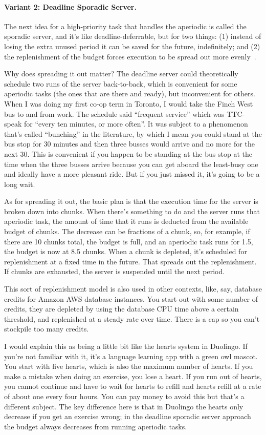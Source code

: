 \paragraph{Variant 2: Deadline Sporadic Server.}
The next idea for a high-priority task that handles the aperiodic is called the sporadic server, and it's like deadline-deferrable, but for two things: (1) instead of losing the extra unused period it can be saved for the future, indefinitely; and (2) the replenishment of the budget forces execution to be spread out more evenly~\cite{aperiodic-server}. 

Why does spreading it out matter? The deadline server could theoretically schedule two runs of the server back-to-back, which is convenient for some aperiodic tasks (the ones that are there and ready), but inconvenient for others. When I was doing my first co-op term in Toronto, I would take the Finch West bus to and from work. The schedule said ``frequent service'' which was TTC-speak for ``every ten minutes, or more often''. It was subject to a phenomenon that's called ``bunching'' in the literature, by which I mean you could stand at the bus stop for 30 minutes and then three busses would arrive and no more for the next 30. This is convenient if you happen to be standing at the bus stop at the time when the three busses arrive because you can get aboard the least-busy one and ideally have a more pleasant ride. But if you just missed it, it's going to be a long wait.

As for spreading it out, the basic plan is that the execution time for the server is broken down into chunks. When there's something to do and the server runs that aperiodic task, the amount of time that it runs is deducted from the available budget of chunks. The decrease can be fractions of a chunk, so, for example, if there are 10 chunks total, the budget is full, and an aperiodic task runs for 1.5, the budget is now at 8.5 chunks. When a chunk is depleted, it's scheduled for replenishment at a fixed time in the future. That spreads out the replenishment. If chunks are exhausted, the server is suspended until the next period.

This sort of replenishment model is also used in other contexts, like, say, database credits for Amazon AWS database instances. You start out with some number of credits, they are depleted by using the database CPU time above a certain threshold, and replenished at a steady rate over time. There is a cap  so you can't stockpile too many credits. 

I would explain this as being a little bit like the hearts system in Duolingo. If you're not familiar with it, it's a language learning app with a green owl mascot. You start with five hearts, which is also the maximum number of hearts. If you make a mistake when doing an exercise, you lose a heart. If you run out of hearts, you cannot continue and have to wait for hearts to refill and hearts refill at a rate of about one every four hours. You can pay money to avoid this but that's a different subject. The key difference here is that in Duolingo the hearts only decrease if you get an exercise wrong; in the deadline sporadic server approach the budget always decreases from running aperiodic tasks.

